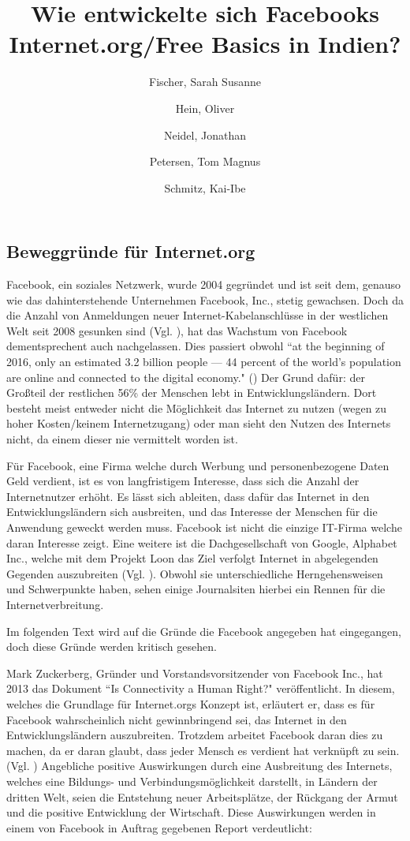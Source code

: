 \documentclass{article}
\title{Wie entwickelte sich Facebooks Internet.org/Free Basics in Indien?}
\author{
  Fischer, Sarah Susanne\\
  \and
  Hein, Oliver\\
  \and
  Neidel, Jonathan\\
  \and
  Petersen, Tom Magnus\\
  \and
  Schmitz, Kai-Ibe\\
}
\begin{document}
\subsection{Beweggründe für Internet.org}
Facebook, ein soziales Netzwerk, wurde 2004 gegründet und ist seit dem, genauso wie das dahinterstehende Unternehmen Facebook, Inc., stetig gewachsen. 
Doch da die Anzahl von Anmeldungen neuer Internet-Kabelanschlüsse in der westlichen Welt seit 2008 gesunken sind
(Vgl. \cite{ICTslowingDown}), hat das Wachstum von Facebook dementsprechent auch nachgelassen.
Dies passiert obwohl ``at the beginning of 2016, only an estimated 3.2 billion people — 44 percent of the world’s population are online and connected to the digital economy." (\cite[7]{connectWorld})
Der Grund dafür: der Großteil der restlichen 56\% der Menschen lebt in Entwicklungsländern. Dort besteht meist entweder nicht die Möglichkeit das Internet zu nutzen (wegen zu hoher Kosten/keinem Internetzugang) oder man sieht den Nutzen des Internets nicht, da einem dieser nie vermittelt worden ist.

\medskip

Für Facebook, eine Firma welche durch Werbung und personenbezogene Daten Geld verdient, ist es von langfristigem Interesse, dass sich die Anzahl der Internetnutzer erhöht.
Es lässt sich ableiten, dass dafür das Internet in den Entwicklungsländern sich ausbreiten, und das Interesse der Menschen für die Anwendung geweckt werden muss.
Facebook ist nicht die einzige IT-Firma welche daran Interesse  zeigt.
Eine weitere ist die Dachgesellschaft von Google, Alphabet Inc., welche mit dem Projekt Loon das Ziel verfolgt Internet in abgelegenden Gegenden auszubreiten (Vgl. \cite{projectLoon}).
Obwohl sie unterschiedliche Herngehensweisen und Schwerpunkte haben, sehen einige Journalsiten hierbei ein Rennen für die Internetverbreitung. 

\medskip
    
Im folgenden Text wird auf die Gründe die Facebook angegeben hat eingegangen, doch diese Gründe werden kritisch gesehen.   

\medskip

Mark Zuckerberg, Gründer und Vorstandsvorsitzender von Facebook Inc., hat 2013 das Dokument ``Is Connectivity a Human Right?" veröffentlicht.
In diesem, welches die Grundlage für Internet.orgs Konzept ist, erläutert er, dass es für Facebook wahrscheinlich nicht gewinnbringend sei, das Internet in den Entwicklungsländern auszubreiten. Trotzdem arbeitet Facebook daran dies zu machen, da er daran glaubt, dass jeder Mensch es verdient hat verknüpft zu sein.(Vgl. \cite[1]{HumanRight})
Angebliche positive Auswirkungen durch eine Ausbreitung des Internets, welches eine Bildungs- und Verbindungsmöglichkeit darstellt, in Ländern der dritten Welt, seien die Entstehung neuer Arbeitsplätze, der Rückgang der Armut und die positive Entwicklung der Wirtschaft. Diese Auswirkungen werden in einem von Facebook in Auftrag gegebenen Report verdeutlicht:
                    
\end{document}

